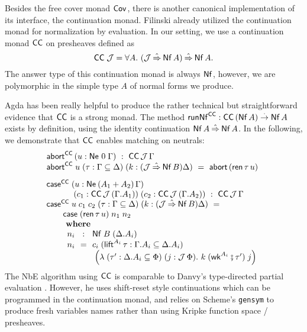 \documentclass[sigplan,screen]{acmart}
\begin{document}
Besides the free cover monad $\Cov$, there is another canonical
implementation of its interface, the continuation monad.
Filinski
\cite[Section~5.4]{filinski:semaccounttdpe}
\cite[Section~3.2]{filinski:tlca01}
already utilized the continuation monad for
normalization by evaluation.
In our setting, we use a continuation monad $\CC$ on presheaves
defined as
\[
  \CC\;\J = \forall A.\ (\J \hatto \tNf\,A) \hatto \tNf\,A
  .
\]
The answer type of this continuation monad is always $\tNf$, however,
we are polymorphic in the simple type $A$ of normal forms we produce.%

Agda has been really helpful to produce the rather technical but
straightforward evidence that $\CC$ is a strong monad.
The method $\trunNf[\CC] : \CC\,(\tNf\,A) \todot \tNf\,A$
exists by definition, using the identity continuation $\tNf\,A \hatto \tNf\,A$.
In the following, we demonstrate that $\CC$
enables matching on neutrals:
\[
\begin{array}{l}
  \tabort^{\CC} \, (u : \Ne \tyzero \Gamma) ~:~  \CC\,\J\,\Gamma \\
  \tabort^{\CC}
    \; u
    \; (\tau : \Gamma \sublist \Delta)
    \; (k : (\J \hatto \tNf\,B)\Delta)
     ~=~
    \tabort\,(\tren\,\tau\,u)
\\[2ex]
  \tcase^{\CC}
     \; (u : \NeP {A_1 + A_2} \Gamma) \\ \qquad \quad
     \; (c_1 : \CC\,\J\,(\cext \Gamma {A_1}))
     \; (c_2 : \CC\,\J\,(\cext \Gamma {A_2}))
    ~:~ \CC\,\J\,\Gamma \\
  \tcase^{\CC}
    \; u
    \; c_1
    \; c_2
    \; (\tau : \Gamma \sublist \Delta)
    \; (k : (\J \hatto \tNf\,B)\Delta)
     ~=~ \\  \qquad
    \tcase\;(\tren\,\tau\,u)\;n_1\;n_2
    \\ \qquad \bwhere \\
\qquad
  \begin{array}{l@{~~}c@{~~}l}
     n_i & : & \Nf B {(\cext \Delta {A_i})} \\
     n_i & = & c_i
      \; (\tlift^{A_i}\,\tau
            : \cext \Gamma {A_i} \sublist \cext \Delta {A_i})
\\ &&
      \; \left(\lambda
            \; (\tau' : \cext \Delta {A_i} \sublist \Phi)
            \; (j :  \J\,\Phi) .
            \ k
            \; (\twk^{A_i} \rcomp \tau')
            \; j
         \right)
  \end{array}
\end{array}
\]
The NbE algorithm using $\CC$ is comparable to Danvy's type-directed
partial evaluation \cite[Figure~8]{danvy:popl96}.  However, he uses
shift-reset style continuations which can be programmed in the
continuation monad, and relies on Scheme's \texttt{gensym} to produce
fresh variables names rather than using Kripke function space / presheaves.
\end{document}
